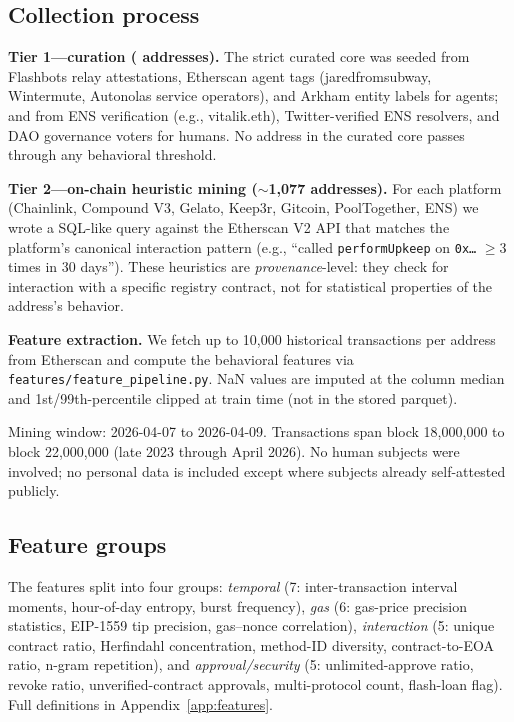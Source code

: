 \documentclass[10pt]{article}
\begin{document}
\subsection{Collection process}

\textbf{Tier 1---curation (\datasetStrictCoreN{} addresses).} The strict curated core was seeded from Flashbots relay attestations, Etherscan agent tags (jaredfromsubway, Wintermute, Autonolas service operators), and Arkham entity labels for agents; and from ENS verification (e.g., vitalik.eth), Twitter-verified ENS resolvers, and DAO governance voters for humans. No address in the curated core passes through any behavioral threshold.

\textbf{Tier 2---on-chain heuristic mining ($\sim$1{,}077 addresses).} For each platform (Chainlink, Compound V3, Gelato, Keep3r, Gitcoin, PoolTogether, ENS) we wrote a SQL-like query against the Etherscan V2 API that matches the platform's canonical interaction pattern (e.g., ``called \texttt{performUpkeep} on \texttt{0x\ldots} $\geq 3$ times in 30 days''). These heuristics are \emph{provenance}-level: they check for interaction with a specific registry contract, not for statistical properties of the address's behavior.

\textbf{Feature extraction.} We fetch up to 10{,}000 historical transactions per address from Etherscan and compute the \datasetNFeatures{} behavioral features via \texttt{features/feature\_pipeline.py}. NaN values are imputed at the column median and 1st/99th-percentile clipped at train time (not in the stored parquet).

Mining window: 2026-04-07 to 2026-04-09. Transactions span block 18{,}000{,}000 to block 22{,}000{,}000 (late 2023 through April 2026). No human subjects were involved; no personal data is included except where subjects already self-attested publicly.

\subsection{Feature groups}
\label{sec:features}

The \datasetNFeatures{} features split into four groups: \emph{temporal} (7: inter-transaction interval moments, hour-of-day entropy, burst frequency), \emph{gas} (6: gas-price precision statistics, EIP-1559 tip precision, gas--nonce correlation), \emph{interaction} (5: unique contract ratio, Herfindahl concentration, method-ID diversity, contract-to-EOA ratio, n-gram repetition), and \emph{approval/security} (5: unlimited-approve ratio, revoke ratio, unverified-contract approvals, multi-protocol count, flash-loan flag). Full definitions in Appendix~\ref{app:features}.
\end{document}
